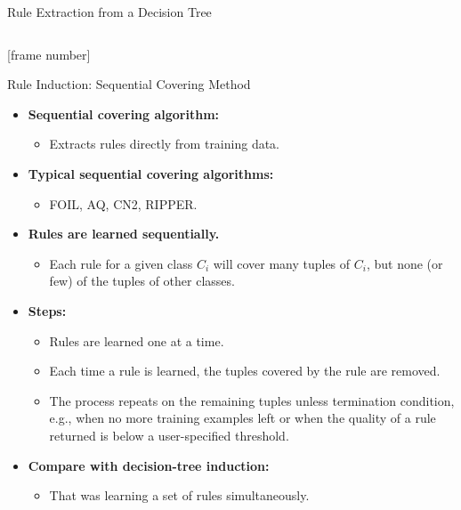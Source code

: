 \documentclass[aspectratio=169,t,table]{beamer}
\begin{document}
{\begin{frame}{Rule Extraction from a Decision Tree}
\begin{columns}
\begin{column}{0.55\textwidth}
        \end{column}
      \end{columns}
    \end{frame}
  }

  {
    [frame number]
    \begin{frame}{Rule Induction: Sequential Covering Method}
      \begin{itemize}
        \item \textbf{Sequential covering algorithm:}
        \begin{itemize}
          \item Extracts rules directly from training data.
        \end{itemize}
        \item \textbf{Typical sequential covering algorithms:}
        \begin{itemize}
          \item FOIL, AQ, CN2, RIPPER.
        \end{itemize}
        \item \textbf{Rules are learned {\color{airforceblue}sequentially}.}
        \begin{itemize}
          \item Each rule for a given class $C_i$ will cover many tuples of $C_i$, but none (or few) of the tuples of other classes.
        \end{itemize}
        \item \textbf{Steps:}
        \begin{itemize}
          \item Rules are learned one at a time.
          \item Each time a rule is learned, the tuples covered by the rule are removed.
          \item The process repeats on the remaining tuples unless termination condition, e.g., when no more training examples left or when the quality of a rule returned is below a user-specified threshold.
        \end{itemize}
        \item \textbf{Compare with decision-tree induction:}
        \begin{itemize}
          \item That was learning a set of rules simultaneously.
        \end{itemize}
      \end{itemize}
    \end{frame}
  }
\end{document}
